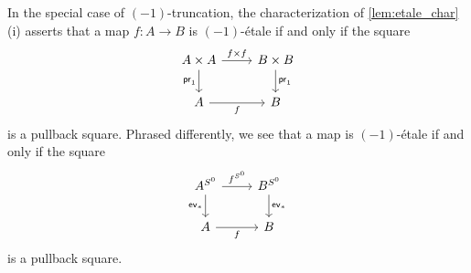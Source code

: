 \documentclass[9pt,twosided]{amsart}
\begin{document}
\begin{rmk}\label{rmk:-1etale}
In the special case of $(-1)$-truncation, the characterization of \cref{lem:etale_char} (i) asserts that a map $f:A\to B$ is $(-1)$-\'etale if and only if the square
\begin{equation*}
\begin{tikzcd}
A\times A \arrow[d,swap,"\proj 1"] \arrow[r,"{f\times f}"] & B\times B \arrow[d,"\proj 1"] \\
A \arrow[r,swap,"f"] & B
\end{tikzcd}
\end{equation*}
is a pullback square. Phrased differently, we see that a map is $(-1)$-\'etale if and only if the square
\begin{equation*}
\begin{tikzcd}
A^{\sphere{0}} \arrow[d,swap,"\mathsf{ev}_\ast"] \arrow[r,"f^{\sphere{0}}"] & B^{\sphere{0}} \arrow[d,"\mathsf{ev}_\ast"] \\
A \arrow[r,swap,"f"] & B
\end{tikzcd}
\end{equation*}
is a pullback square.
\end{rmk}
\end{document}
